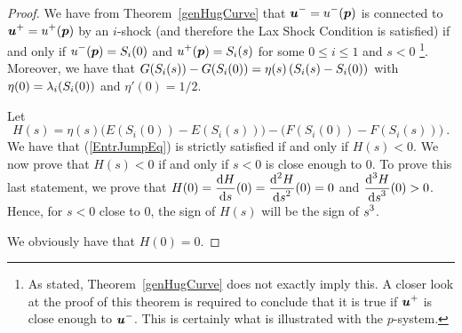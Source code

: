 \begin{proof}
We have from Theorem~\ref{genHugCurve} that
$\displaystyle {\bm{u}}^- = u^-({\bm{p}})$ is connected to
$\displaystyle {\bm{u}}^+ = u^+({\bm{p}})$ 
by an $i$-shock (and therefore the Lax Shock Condition is satisfied)
if and only if $\displaystyle u^-({\bm{p}}) = S_i(0)$ and
$\displaystyle u^+({\bm{p}}) = S_i(s)$ for some $0 \leq i \leq 1$
and $s<0$ \footnote{As stated, Theorem~\ref{genHugCurve} does not
exactly imply this.  A closer look at the proof of this theorem is
required to conclude that it is true if $\displaystyle {\bm{u}}^+$ is
close enough to $\displaystyle {\bm{u}}^-$.  This is certainly what is
illustrated with the $p$-system.}.  Moreover, we have that
$\displaystyle G(S_i(s))-G(S_i(0))
= \eta(s) \left(S_i(s) - S_i(0)\right)$
with $\displaystyle \eta(0) = \lambda_i(S_i(0))$ and $\eta'(0) = 1/2$.

Let
\[
  H(s) = \eta(s) \big( E(S_i(0)) - E(S_i(s)) \big)
  - \big( F(S_i(0))- F(S_i(s)) \big) \ .
\]
We have that (\ref{EntrJumpEq}) is strictly satisfied if and only if
$H(s) < 0$.  We now prove that $H(s) <0$ if and only if $s<0$ is close
enough to $0$.  To prove this last statement, we prove that
$\displaystyle H(0) = \frac{\mathrm{d}H}{\mathrm{d}{s}}(0) = \frac{\displaystyle \mathrm{d}^{2}{H}} {\displaystyle \mathrm{d}{s}^{2}}(0) = 0$ and
$\displaystyle \frac{\displaystyle \mathrm{d}^{3}{H}} {\displaystyle \mathrm{d}{s}^{3}}(0) > 0$.
Hence, for $s<0$ close to $0$, the sign of $H(s)$ will be the sign of
$\displaystyle s^3$.

We obviously have that $H(0) = 0$.


\end{proof}
